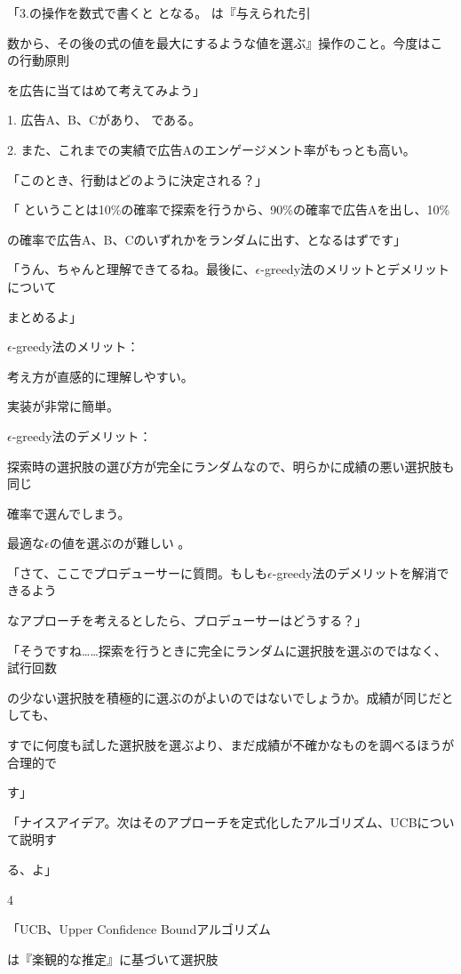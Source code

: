 「3.の操作を数式で書くと となる。 は『与えられた引\par
数から、その後の式の値を最⼤にするような値を選ぶ』操作のこと。今度はこの⾏動原則\par
を広告に当てはめて考えてみよう」\par
1. 広告A、B、Cがあり、 である。\par
2. また、これまでの実績で広告Aのエンゲージメント率がもっとも⾼い。\par
「このとき、⾏動はどのように決定される？」\par
「 ということは10\%の確率で探索を⾏うから、90\%の確率で広告Aを出し、10\%\par
の確率で広告A、B、Cのいずれかをランダムに出す、となるはずです」\par
「うん、ちゃんと理解できてるね。最後に、$\epsilon$-greedy法のメリットとデメリットについて\par
まとめるよ」\par
$\epsilon$-greedy法のメリット：\par
考え⽅が直感的に理解しやすい。\par
実装が⾮常に簡単。\par
$\epsilon$-greedy法のデメリット：\par
探索時の選択肢の選び⽅が完全にランダムなので、明らかに成績の悪い選択肢も同じ\par
確率で選んでしまう。\par
最適な$\epsilon$の値を選ぶのが難しい 。\par
「さて、ここでプロデューサーに質問。もしも$\epsilon$-greedy法のデメリットを解消できるよう\par
なアプローチを考えるとしたら、プロデューサーはどうする？」\par
「そうですね……探索を⾏うときに完全にランダムに選択肢を選ぶのではなく、試⾏回数\par
の少ない選択肢を積極的に選ぶのがよいのではないでしょうか。成績が同じだとしても、\par
すでに何度も試した選択肢を選ぶより、まだ成績が不確かなものを調べるほうが合理的で\par
す」\par
「ナイスアイデア。次はそのアプローチを定式化したアルゴリズム、UCBについて説明す\par
る、よ」\par
4\par
「UCB、Upper Confidence Boundアルゴリズム\par
は『楽観的な推定』に基づいて選択肢\par
